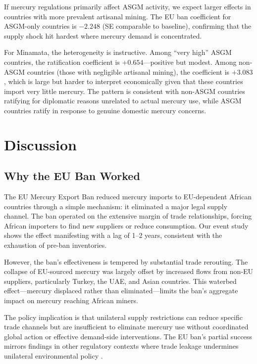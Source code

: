 \documentclass[12pt]{article}
\begin{document}
If mercury regulations primarily affect ASGM activity, we expect larger effects in countries with more prevalent artisanal mining. The EU ban coefficient for ASGM-only countries is $-2.248$ (SE comparable to baseline), confirming that the supply shock hit hardest where mercury demand is concentrated.

For Minamata, the heterogeneity is instructive. Among ``very high'' ASGM countries, the ratification coefficient is $+0.654$---positive but modest. Among non-ASGM countries (those with negligible artisanal mining), the coefficient is $+3.083$, which is large but harder to interpret economically given that these countries import very little mercury. The pattern is consistent with non-ASGM countries ratifying for diplomatic reasons unrelated to actual mercury use, while ASGM countries ratify in response to genuine domestic mercury concerns.


\section{Discussion}

\subsection{Why the EU Ban Worked}

The EU Mercury Export Ban reduced mercury imports to EU-dependent African countries through a simple mechanism: it eliminated a major legal supply channel. The ban operated on the extensive margin of trade relationships, forcing African importers to find new suppliers or reduce consumption. Our event study shows the effect manifesting with a lag of 1--2 years, consistent with the exhaustion of pre-ban inventories.

However, the ban's effectiveness is tempered by substantial trade rerouting. The collapse of EU-sourced mercury was largely offset by increased flows from non-EU suppliers, particularly Turkey, the UAE, and Asian countries. This waterbed effect---mercury displaced rather than eliminated---limits the ban's aggregate impact on mercury reaching African miners.

The policy implication is that unilateral supply restrictions can reduce specific trade channels but are insufficient to eliminate mercury use without coordinated global action or effective demand-side interventions. The EU ban's partial success mirrors findings in other regulatory contexts where trade leakage undermines unilateral environmental policy \citep{fowlie2012emissions}.
\end{document}
